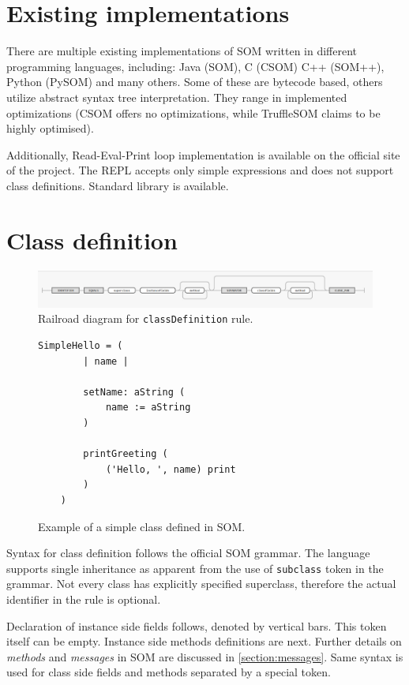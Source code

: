 \documentclass[thesis=M,english]{FITthesis}[2019/12/23]
\begin{document}
\section{Existing implementations}
There are multiple existing implementations of SOM written in different programming languages, including: Java (SOM), C (CSOM) C++ (SOM++), Python (PySOM) and
many others. Some of these are bytecode based, others utilize abstract syntax tree interpretation. They range in implemented optimizations (CSOM offers no 
optimizations, while TruffleSOM claims to be highly optimised).

Additionally, Read-Eval-Print loop implementation is available on the official site of the project. The REPL accepts only simple expressions and does
not support class definitions. Standard library is available. \cite{som-github}

\section{Class definition}
\begin{figure}[h!]
	\centering
	\includegraphics[width=\textwidth]{media/grammar/classDefinition_rrd.png}
	\caption{Railroad diagram for \texttt{classDefinition} rule.}
	\label{fig:classDefinition_rrd}
\end{figure}

\begin{figure}[h!]
\begin{lstlisting}[language=Smalltalk]
	SimpleHello = (
		| name |

		setName: aString (
			name := aString
		)

		printGreeting (
			('Hello, ', name) print
		)
	)
\end{lstlisting}
\caption{Example of a simple class defined in SOM.}
\label{fig:hello_example}
\end{figure}

Syntax for class definition follows the official SOM grammar. The language supports single inheritance as apparent from the use
of \texttt{subclass} token in the grammar. Not every class has explicitly specified superclass, therefore the actual identifier in
the rule is optional.

Declaration of instance side fields follows, denoted by vertical bars. This token itself can be empty. Instance side methods definitions
are next. Further details on \textit{methods} and \textit{messages} in SOM are discussed in \ref{section:messages}.
Same syntax is used for class side fields and methods separated by a special token.
\end{document}
